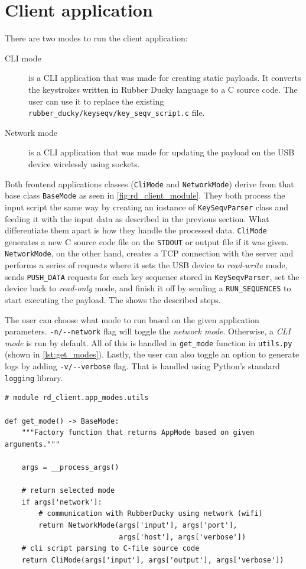 \section{Client application}
There are two modes to run the client application:
\begin{description}
    \item [CLI mode] is a CLI application that was made for creating static payloads. It converts the keystrokes written in Rubber Ducky language to a C source code. The user can use it to replace the existing \verb|rubber_ducky/keyseqv/key_seqv_script.c| file.
    \item [Network mode] is a CLI application that was made for updating the payload on the USB device wirelessly using sockets.
\end{description}
Both frontend applications classes (\verb|CliMode| and \verb|NetworkMode|) derive from that base class \verb|BaseMode| as seen in \autoref{fig:rd_client_module}. They both process the input script the same way by creating an instance of \verb|KeySeqvParser| class and feeding it with the input data as described in the previous section. What differentiate them apart is how they handle the processed data. \verb|CliMode| generates a new C source code file on the \verb|STDOUT| or output file if it was given. \verb|NetworkMode|, on the other hand, creates a TCP connection with the server and performs a series of requests where it sets the USB device to \emph{read-write} mode, sends \verb|PUSH_DATA| requests for each key sequence stored in \verb|KeySeqvParser|, set the device back to \emph{read-only} mode, and finish it off by sending a \verb|RUN_SEQUENCES| to start executing the payload. The  shows the described steps.

The user can choose what mode to run based on the given application parameters. \verb|-n/--network| flag will toggle the \emph{network mode}. Otherwise, a \emph{CLI mode} is run by default. All of this is handled in \verb|get_mode| function in \verb|utils.py| (shown in \autoref{lst:get_modes}). Lastly, the user can also toggle an option to generate logs by adding \verb|-v/--verbose| flag. That is handled using Python's standard \verb|logging| library.

\begin{lstlisting}
# module rd_client.app_modes.utils

def get_mode() -> BaseMode:
    """Factory function that returns AppMode based on given arguments."""

    args = __process_args()

    # return selected mode
    if args['network']:
        # communication with RubberDucky using network (wifi)
        return NetworkMode(args['input'], args['port'],
                           args['host'], args['verbose'])
    # cli script parsing to C-file source code
    return CliMode(args['input'], args['output'], args['verbose'])
\end{lstlisting}

